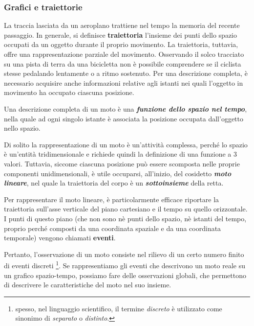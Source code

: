 \subsubsection*{Grafici e traiettorie}

La traccia lasciata da un aeroplano trattiene nel tempo la memoria del recente passaggio.\newline
In generale, si definisce {\bfseries traiettoria} l'insieme dei punti dello spazio occupati da un oggetto durante il proprio movimento.\newline
La traiettoria, tuttavia, offre una rappresentazione parziale del movimento. Osservando il solco tracciato su una pista di terra da una bicicletta non è possibile comprendere se il ciclista stesse pedalando lentamente o a ritmo sostenuto. Per una descrizione completa, è necessario acquisire anche informazioni relative agli istanti nei quali l'oggetto in movimento ha occupato ciascuna posizione.
\newline

Una descrizione completa di un moto è una {\bf \slshape funzione dello spazio nel tempo}, nella quale ad ogni singolo istante è associata la posizione occupata dall'oggetto nello spazio.
\newline

Di solito la rappresentazione di un moto è un'attività complessa, perché lo spazio è un'entità tridimensionale e richiede quindi la definizione di una funzione a 3 valori.
Tuttavia, siccome ciascuna posizione può essere scomposta nelle proprie componenti unidimensionali, è utile occuparsi, all'inizio, del cosidetto {\bf \slshape moto lineare}, nel quale la traiettoria del corpo è un {\bf \slshape sottoinsieme} della retta.
\newline

Per rappresentare il moto lineare, è particolarmente efficace riportare la traiettoria sull'asse verticale del piano cartesiano e il tempo su quello orizzontale. I punti di questo piano (che non sono nè punti dello spazio, nè istanti del tempo, proprio perché composti da una coordinata spaziale e da una coordinata temporale) vengono chiamati {\bf eventi}.

Pertanto, l'osservazione di un moto consiste nel rilievo di un certo numero finito di eventi discreti \footnote{spesso, nel linguaggio scientifico, il termine {\slshape discreto} è utilizzato come sinonimo di {\slshape separato} o {\slshape distinto}.}.
Se rappresentiamo gli eventi che descrivono un moto reale su un grafico spazio-tempo, possiamo fare delle osservazioni globali, che permettono di descrivere le caratteristiche del moto nel suo insieme.\newline

